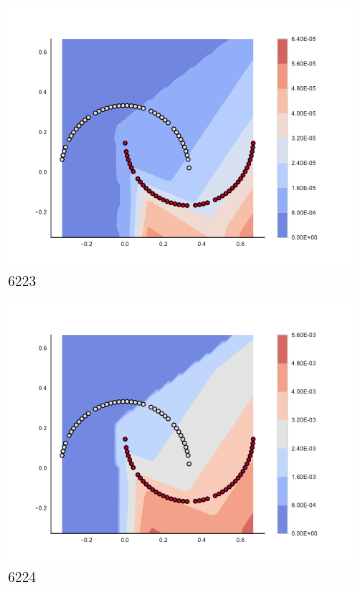 \begin{figure}[h]
\begin{subfigure}[b]{0.09\textwidth}
    \includegraphics[clip, trim=2.35cm 1.75cm 4.5cm 0cm,width=\textwidth]{img/convergence/6223.pdf}
    \caption{6223}
    \label{fig:convergence_6223}
\end{subfigure}
%
\begin{subfigure}[b]{0.09\textwidth}
    \includegraphics[clip, trim=2.35cm 1.75cm 4.5cm 0cm,width=\textwidth]{img/convergence/6224.pdf}
    \caption{6224}
    \label{fig:convergence_6224}
\end{subfigure}
%
\begin{subfigure}[b]{0.09\textwidth}

\end{subfigure}
\end{figure}
